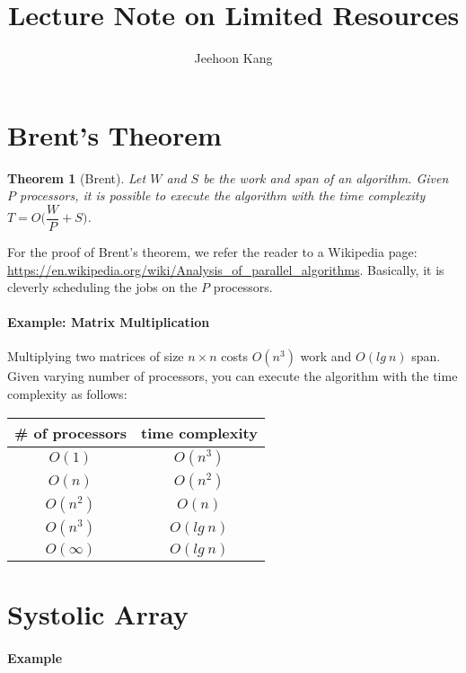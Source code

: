 \documentclass[11pt,a4paper,oneside,microtype,nokorean]{oblivoir}
\newtheorem{theorem}{Theorem}
\begin{document}
\title{Lecture Note on Limited Resources}
\author{Jeehoon Kang}
\maketitle

\section{Brent's Theorem}

\begin{theorem}[Brent]
  Let $W$ and $S$ be the work and span of an algorithm.  Given $P$ processors, it is possible to
  execute the algorithm with the time complexity $T = O \Big( \dfrac{W}{P} + S \Big)$.
\end{theorem}

For the proof of Brent's theorem, we refer the reader to a Wikipedia page:
\url{https://en.wikipedia.org/wiki/Analysis_of_parallel_algorithms}.  Basically, it is cleverly
scheduling the jobs on the $P$ processors.



\paragraph{Example: Matrix Multiplication}

Multiplying two matrices of size $n \times n$ costs $O(n^3)$ work and $O(lg~n)$ span.  Given varying
number of processors, you can execute the algorithm with the time complexity as follows:

\begin{center}
\begin{tabular}{ c | c }
 \# of processors & time complexity \\
  \hline
 $O(1)$ & $O(n^3)$ \\
 $O(n)$ & $O(n^2)$ \\
 $O(n^2)$ & $O(n)$ \\
 $O(n^3)$ & $O(lg~n)$ \\
 $O(\infty)$ & $O(lg~n)$
\end{tabular}
\end{center}



\section{Systolic Array}

\paragraph{Example}
\end{document}

